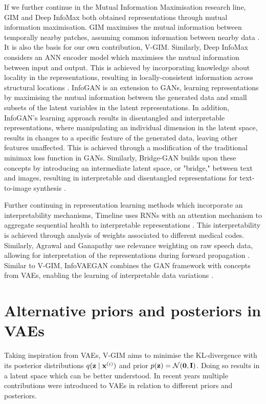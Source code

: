 	If we further continue in the Mutual Information Maximisation research line, GIM and Deep InfoMax both obtained representations through mutual information maximisation. GIM maximises the mutual information between temporally nearby patches, assuming common information between nearby data \cite{lowePuttingEndEndtoEnd2020}. It is also the basis for our own contribution, V-GIM. Similarly, Deep InfoMax considers an ANN encoder model which maximises the mutual information between input and output. This is achieved by incorporating knowledge about locality in the representations, resulting in locally-consistent information across structural locations \cite{hjelmLearningDeepRepresentations2019}.
	InfoGAN \cite{chenInfoGANInterpretableRepresentation2016} is an extension to GANs, learning representations by maximising the mutual information between the generated data and small subsets of the latent variables in the latent representations. In addition, InfoGAN's learning approach results in disentangled and interpretable representations, where manipulating an individual dimension in the latent space, results in changes to a specific feature of the generated data, leaving other features unaffected. This is achieved through a modification of the traditional minimax loss function in GANs. Similarly, Bridge-GAN builds upon these concepts by introducing an intermediate latent space, or "bridge," between text and images, resulting in interpretable and disentangled representations for text-to-image synthesis \cite{yuanBridgeGANInterpretableRepresentation2020}.
	
	Further continuing in representation learning methods which incorporate an interpretability mechanisms, Timeline uses RNNs with an attention mechanism to aggregate sequential health to interpretable representations \cite{baiInterpretableRepresentationLearning2018}. This interpretability is achieved through analysis of weights associated to different medical codes. Similarly, Agrawal and Ganapathy use relevance weighting on raw speech data, allowing for interpretation of the representations during forward propagation \cite{agrawalInterpretableRepresentationLearning2020}. Similar to V-GIM, InfoVAEGAN combines the GAN framework with concepts from VAEs, enabling the learning of interpretable data variations \cite{yeInfoVAEGANLearningJoint2021}.

	
	
	
		

\section{Alternative priors and posteriors in VAEs}	%
	Taking inspiration from VAEs, V-GIM aims to minimise the KL-divergence with its posterior distributions $q (\mathbf{z} \mid \mathbf{x}^{(i)})$ and prior $p(\mathbf{z})=\mathcal{N}(\bm{\mathbf{0}}, \mathbf{I})$. Doing so results in a latent space which can be better understood. In recent years multiple contributions were introduced to VAEs in relation to different priors and posteriors.
	
